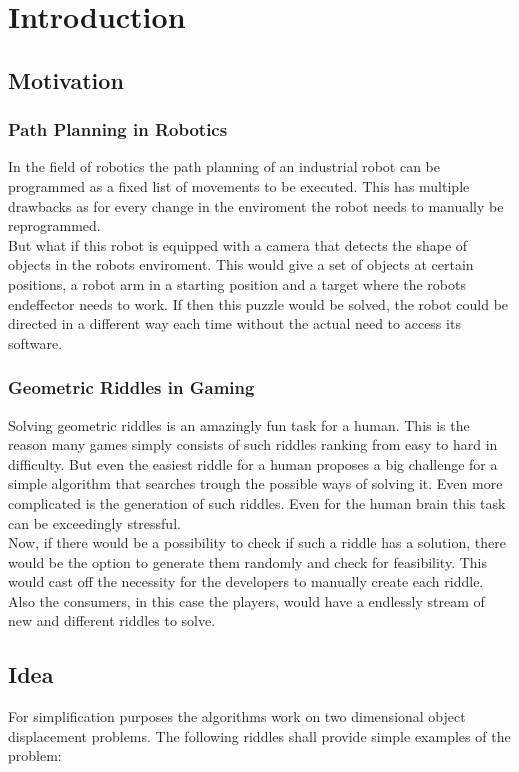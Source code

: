 \chapter{Introduction}
\label{cha:Introduction}

\section{Motivation}
\label{sec:Motivation}
\subsection{Path Planning in Robotics}
In the field of robotics the path planning of an industrial robot can be programmed as a fixed list of movements to be executed. This has multiple drawbacks as for every change in the enviroment the robot needs to manually be reprogrammed.\\
But what if this robot is equipped with a camera that detects the shape of objects in the robots enviroment. This would give a set of objects at certain positions, a robot arm in a starting position and a target where the robots endeffector needs to work. If then this puzzle would be solved, the robot could be directed in a different way each time without the actual need to access its software.


\subsection{Geometric Riddles in Gaming}
Solving geometric riddles is an amazingly fun task for a human. This is the reason many games simply consists of such riddles ranking from easy to hard in difficulty. But even the easiest riddle for a human proposes a big challenge for a simple algorithm that searches trough the possible ways of solving it. Even more complicated is the generation of such riddles. Even for the human brain this task can be exceedingly stressful.\\
 Now, if there would be a possibility to check if such a riddle has a solution, there would be the option to generate them randomly and check for feasibility. This would cast off the necessity for the developers to manually create each riddle. Also the consumers, in this case the players, would have a endlessly stream of new and different riddles to solve.


\section{Idea}
\label{sec:Idea}
For simplification purposes the algorithms work on two dimensional object displacement problems. The following riddles shall provide simple examples of the problem:\\

